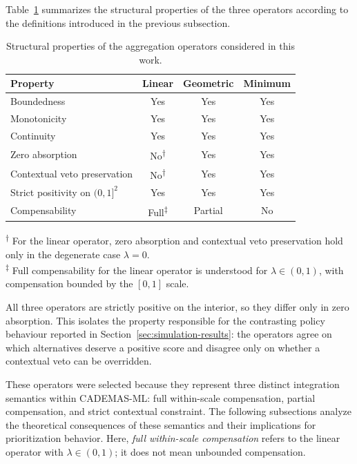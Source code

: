 \documentclass[mathematics,article,submit,moreauthors]{Definitions/mdpi}
\begin{document}
Table~\ref{tab:operator-properties} summarizes the structural
properties of the three operators according to the definitions
introduced in the previous subsection.

\begin{table}[H]
\caption{Structural properties of the aggregation operators considered in this work.}
\label{tab:operator-properties}
\centering
\renewcommand{\arraystretch}{1.3}
\begin{tabular}{lccc}
\toprule
Property & Linear & Geometric & Minimum \\
\midrule
Boundedness & Yes & Yes & Yes \\
Monotonicity & Yes & Yes & Yes \\
Continuity & Yes & Yes & Yes \\
Zero absorption & No\textsuperscript{\(\dagger\)} & Yes & Yes \\
Contextual veto preservation & No\textsuperscript{\(\dagger\)} & Yes & Yes \\
{\color{teal}Strict positivity on \((0,1]^2\)} & {\color{teal}Yes} & {\color{teal}Yes} & {\color{teal}Yes} \\
Compensability & Full\textsuperscript{\(\ddagger\)} & Partial & No \\
\bottomrule
\end{tabular}

\raggedright
{\color{red}\textsuperscript{\(\dagger\)} For the linear operator, zero absorption and contextual veto preservation hold only in the degenerate case \(\lambda=0\).}\\
{\color{red}\textsuperscript{\(\ddagger\)} Full compensability for the linear operator is understood for \(\lambda\in(0,1)\), with compensation bounded by the \([0,1]\) scale.}
\end{table}

{\color{teal}All three operators are strictly positive on the interior, so
they differ only in zero absorption. This isolates the property
responsible for the contrasting policy behaviour reported in
Section~\ref{sec:simulation-results}: the operators agree on which
alternatives deserve a positive score and disagree only on whether a
contextual veto can be overridden.}

These operators were selected because they represent three distinct
integration semantics within CADEMAS-ML: {\color{blue}full within-scale}
compensation, partial compensation, and strict contextual constraint. The
following subsections analyze the theoretical consequences of these
semantics and their implications for prioritization behavior.
{\color{blue}Here, \textit{full within-scale compensation} refers to the
linear operator with \(\lambda\in(0,1)\); it does not mean unbounded
compensation.}
\end{document}
